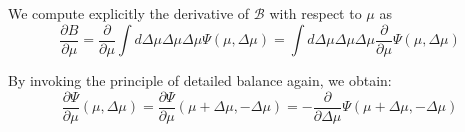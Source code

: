 %
%
%
%
We compute explicitly the derivative of \( \mathcal B \) with respect to \( \mu \) as
%
\begin{equation}
\frac{\partial B}{\partial \mu} = \frac{\partial}{\partial\mu} \int d\Delta\mu \Delta\mu\Delta\mu \Psi(\mu,  \Delta\mu)
=   \int d\Delta\mu \Delta\mu\Delta\mu \frac{\partial}{\partial\mu} \Psi(\mu,  \Delta\mu)
\end{equation}

By invoking the principle of detailed balance again, we obtain:
%
{\color{red}\begin{equation}
\frac{\partial\Psi}{\partial\mu}(\mu,\Delta\mu) = 
\frac{\partial\Psi}{\partial\mu}(\mu+\Delta\mu ,-\Delta\mu) = 
-\frac{\partial}{\partial \Delta\mu} \Psi(\mu+\Delta\mu, -\Delta\mu)
\end{equation}}

